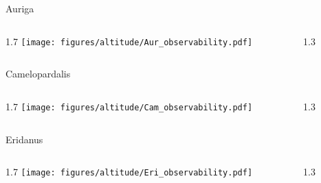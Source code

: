 \documentclass[final]{beamer}
\newlength{\colwidth}
\begin{document}
\begin{frame}[t]{}

  \Large{Auriga}
  \begin{columns}[T]
    \begin{column}{1.7\colwidth}
      \centering
      \texttt{[image: figures/altitude/Aur\_observability.pdf]}
    \end{column}
    \begin{column}{1.3\colwidth}
      \Large
      
    \end{column}
  \end{columns}

  \Large{Camelopardalis}
  \begin{columns}[T]
    \begin{column}{1.7\colwidth}
      \centering
      \texttt{[image: figures/altitude/Cam\_observability.pdf]}
    \end{column}
    \begin{column}{1.3\colwidth}
      \Large
      
    \end{column}
  \end{columns}

  \Large{Eridanus}
  \begin{columns}[T]
    \begin{column}{1.7\colwidth}
      \centering
      \texttt{[image: figures/altitude/Eri\_observability.pdf]}
    \end{column}
    \begin{column}{1.3\colwidth}
      \Large
      
    \end{column}
  \end{columns}
\end{frame}

\end{document}
